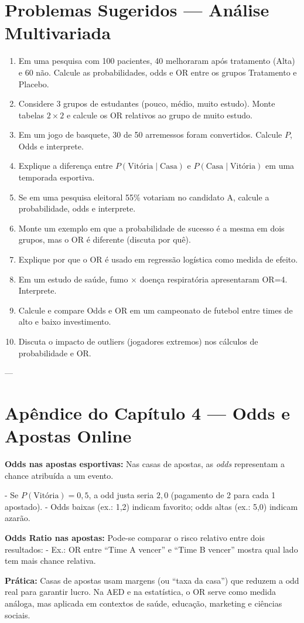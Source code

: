 \section*{Problemas Sugeridos — Análise Multivariada}
\begin{enumerate}[leftmargin=*]
  \item Em uma pesquisa com 100 pacientes, 40 melhoraram após tratamento (Alta) e 60 não. Calcule as probabilidades, odds e OR entre os grupos Tratamento e Placebo.  
  \item Considere 3 grupos de estudantes (pouco, médio, muito estudo). Monte tabelas $2\times 2$ e calcule os OR relativos ao grupo de muito estudo.  
  \item Em um jogo de basquete, 30 de 50 arremessos foram convertidos. Calcule $P$, Odds e interprete.  
  \item Explique a diferença entre $P(\text{Vitória}\mid \text{Casa})$ e $P(\text{Casa}\mid \text{Vitória})$ em uma temporada esportiva.  
  \item Se em uma pesquisa eleitoral 55\% votariam no candidato A, calcule a probabilidade, odds e interprete.  
  \item Monte um exemplo em que a probabilidade de sucesso é a mesma em dois grupos, mas o OR é diferente (discuta por quê).  
  \item Explique por que o OR é usado em regressão logística como medida de efeito.  
  \item Em um estudo de saúde, fumo $\times$ doença respiratória apresentaram OR=4. Interprete.  
  \item Calcule e compare Odds e OR em um campeonato de futebol entre times de alto e baixo investimento.  
  \item Discuta o impacto de outliers (jogadores extremos) nos cálculos de probabilidade e OR.
\end{enumerate}

---

\section*{Apêndice do Capítulo 4 — Odds e Apostas Online}

\begin{ProofBox}
\textbf{Odds nas apostas esportivas:}  
Nas casas de apostas, as \emph{odds} representam a chance atribuída a um evento.  

- Se $P(\text{Vitória})=0,5$, a odd justa seria $2,0$ (pagamento de 2 para cada 1 apostado).  
- Odds baixas (ex.: 1,2) indicam favorito; odds altas (ex.: 5,0) indicam azarão.

\textbf{Odds Ratio nas apostas:}  
Pode-se comparar o risco relativo entre dois resultados:  
- Ex.: OR entre “Time A vencer” e “Time B vencer” mostra qual lado tem mais chance relativa.  

\textbf{Prática:}  
Casas de apostas usam margens (ou “taxa da casa”) que reduzem a odd real para garantir lucro.  
Na AED e na estatística, o OR serve como medida análoga, mas aplicada em contextos de saúde, educação, marketing e ciências sociais.
\end{ProofBox}

